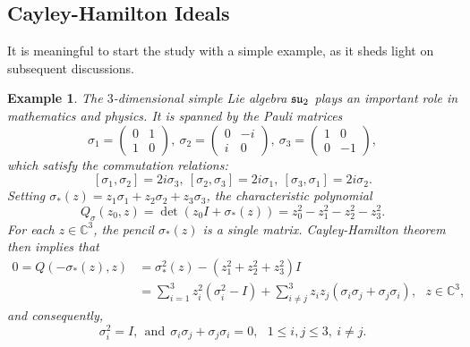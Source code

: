 \documentclass[draft, 12pt, reqno]{amsart}
\newcommand{\C}{{\mathbb C}}
\numberwithin{equation}{section}
\theoremstyle{plain}
\newtheorem{example}[theorem]{Example}
\begin{document}
\subsection{Cayley-Hamilton Ideals}

 It is meaningful to start the study with a simple example, as it sheds light on subsequent discussions.

\begin{example}\label{Pmatrices} \normalfont
The $3$-dimensional simple Lie algebra $\frak{su}_2$ plays an important role in mathematics and physics. It is spanned by the {\em Pauli matrices}
\[\sigma_1=\left(\begin{matrix}
0 & 1\\
1 & 0
\end{matrix}\right),\ \sigma_2=\left(\begin{matrix}
0 & -i\\
i & 0
\end{matrix}\right),\ \sigma_3=\left(\begin{matrix}
1 & 0 \\
0 & -1
\end{matrix}\right),\]
which satisfy the commutation relations:
\begin{equation}\label{Pcom}
 [\sigma_1,\sigma_2]=2i\sigma_3,\  [\sigma_2,\sigma_3]=2i\sigma_1,\  [\sigma_3,\sigma_1]=2i\sigma_2.
 \end{equation}
Setting $\sigma_* (z)=z_1\sigma_1+z_2\sigma_2+ z_3\sigma_3$, the characteristic polynomial \[Q_\sigma(z_0,z)=\det (z_0I+\sigma_*(z))=z_0^2-z_1^2-z_2^2-z_3^2.\] For each $z\in \C^3$, the pencil $\sigma_* (z)$ is a single matrix. Cayley-Hamilton theorem then implies that
\begin{align*}
0=Q(-\sigma_*(z), z)&= \sigma_*^2(z)-(z_1^2+z_2^2+z_3^2)I\\
&=\sum_{i=1}^3z_i^2(\sigma_i^2-I)+\sum_{i\neq j}^3z_iz_j(\sigma_i\sigma_j+\sigma_j\sigma_i),\ \ \ z\in \C^3,
\end{align*}
and consequently,
\begin{equation}\label{Pauli}
\sigma_i^2=I,\ \ \text{and}\ \ \sigma_i\sigma_j+\sigma_j\sigma_i=0, \ \ \ 1\leq i, j\leq 3,\ i\neq j.
\end{equation}
\end{example}
\end{document}

